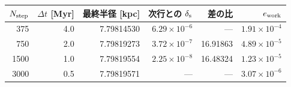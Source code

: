 \begin{tabular}{rrrrrr}\toprule
$N_{\rm step}$ & $\Delta t$ [Myr] & 最終半径 [kpc] & 次行との $\delta_{\rm s}$ & 差の比 & $e_{\rm work}$ \\
\midrule
375 & 4.0 & 7.79814530 & $6.29\times 10^{-6}$ & --- & $1.91\times 10^{-4}$ \\
750 & 2.0 & 7.79819273 & $3.72\times 10^{-7}$ & 16.91863 & $4.89\times 10^{-5}$ \\
1500 & 1.0 & 7.79819554 & $2.25\times 10^{-8}$ & 16.48324 & $1.23\times 10^{-5}$ \\
3000 & 0.5 & 7.79819571 & --- & --- & $3.07\times 10^{-6}$ \\
\bottomrule\end{tabular}
